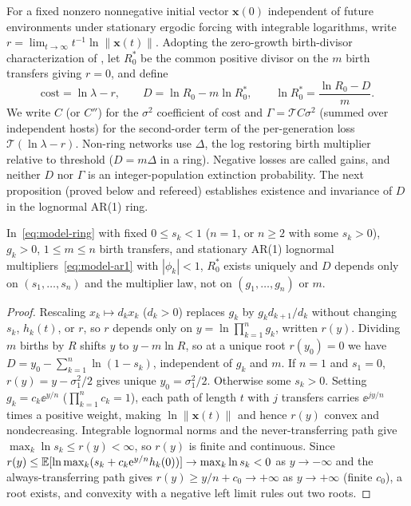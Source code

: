 For a fixed nonzero nonnegative initial vector $\mathbf{x}(0)$ independent of future environments under stationary ergodic forcing with integrable logarithms, write $r = \lim_{t\to\infty} t^{-1}\ln\|\mathbf{x}(t)\|$. Adopting the zero-growth birth-divisor characterization of \citet{bacaer2013}, let $R_0^*$ be the common positive divisor on the $m$ birth transfers giving $r = 0$, and define
\begin{equation}\label{eq:model-loss}
\mathrm{cost} = \ln\lambda - r, \qquad D = \ln R_0 - m\ln R_0^*, \qquad \ln R_0^* = \frac{\ln R_0 - D}{m}.
\end{equation}
We write $C$ (or $C''$) for the $\sigma^2$ coefficient of $\mathrm{cost}$ and $\Gamma = \mathcal{T} C \sigma^2$ (summed over independent hosts) for the second-order term of the per-generation loss $\mathcal{T}(\ln\lambda - r)$. Non-ring networks use $\Delta$, the log restoring birth multiplier relative to threshold ($D = m\Delta$ in a ring). Negative losses are called gains, and neither $D$ nor $\Gamma$ is an integer-population extinction probability. The next proposition (proved below and refereed) establishes existence and invariance of $D$ in the lognormal AR(1) ring.

\begin{proposition}\label{prop:model-loss}
In~\eqref{eq:model-ring} with fixed $0 \le s_k < 1$ ($n = 1$, or $n \ge 2$ with some $s_k > 0$), $g_k > 0$, $1 \le m \le n$ birth transfers, and stationary AR(1) lognormal multipliers~\eqref{eq:model-ar1} with $|\phi_k| < 1$, $R_0^*$ exists uniquely and $D$ depends only on $(s_1, \dots, s_n)$ and the multiplier law, not on $(g_1, \dots, g_n)$ or $m$.
\end{proposition}

\begin{proof}
Rescaling $x_k \mapsto d_k x_k$ ($d_k > 0$) replaces $g_k$ by $g_k d_{k+1}/d_k$ without changing $s_k$, $h_k(t)$, or $r$, so $r$ depends only on $y = \ln\prod_{k=1}^n g_k$, written $r(y)$. Dividing $m$ births by $R$ shifts $y$ to $y - m\ln R$, so at a unique root $r(y_0) = 0$ we have $D = y_0 - \sum_{k=1}^n \ln(1 - s_k)$, independent of $g_k$ and $m$. If $n = 1$ and $s_1 = 0$, $r(y) = y - \sigma_1^2/2$ gives unique $y_0 = \sigma_1^2/2$. Otherwise some $s_k > 0$. Setting $g_k = c_k \ee^{y/n}$ ($\prod_{k=1}^n c_k = 1$), each path of length $t$ with $j$ transfers carries $\ee^{j y/n}$ times a positive weight, making $\ln\|\mathbf{x}(t)\|$ and hence $r(y)$ convex and nondecreasing. Integrable lognormal norms and the never-transferring path give $\max_k \ln s_k \le r(y) < \infty$, so $r(y)$ is finite and continuous. Since $r(y) \le \mathbb{E}[\ln\max_k(s_k + c_k \mathrm{e}^{y/n} h_k(0))] \to \max_k \ln s_k < 0$ as $y \to -\infty$ and the always-transferring path gives $r(y) \ge y/n + c_0 \to +\infty$ as $y \to +\infty$ (finite $c_0$), a root exists, and convexity with a negative left limit rules out two roots.
\end{proof}

